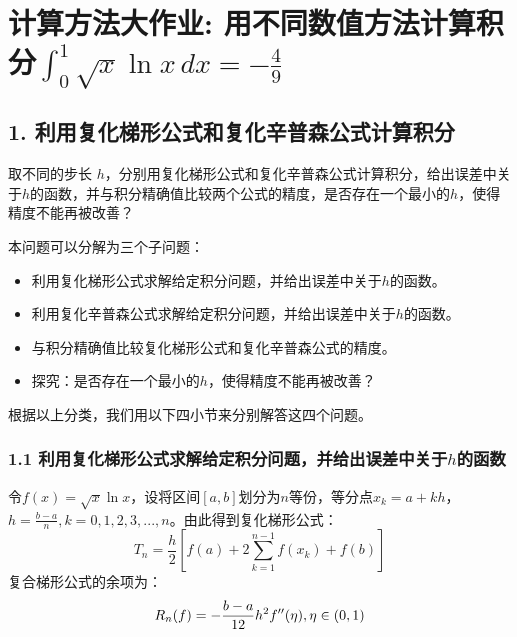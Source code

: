 
\chapter*{计算方法大作业: 用不同数值方法计算积分$\int_{0}^{1} \sqrt{x} \ln x  \,dx = -\frac{4}{9}$}

\section*{1. 利用复化梯形公式和复化辛普森公式计算积分}

取不同的步长 $h$，分别用复化梯形公式和复化辛普森公式计算积分，给出误差中关于$h$的函数，并与积分精确值比较两个公式的精度，是否存在一个最小的$h$，使得精度不能再被改善？

本问题可以分解为三个子问题：
\begin{itemize}
    \item 利用复化梯形公式求解给定积分问题，并给出误差中关于$h$的函数。
    \item 利用复化辛普森公式求解给定积分问题，并给出误差中关于$h$的函数。
    \item 与积分精确值比较复化梯形公式和复化辛普森公式的精度。
    \item 探究：是否存在一个最小的$h$，使得精度不能再被改善？
\end{itemize}

根据以上分类，我们用以下四小节来分别解答这四个问题。

\subsection*{1.1 利用复化梯形公式求解给定积分问题，并给出误差中关于$h$的函数}

令$f(x) = \sqrt{x} \ln x$，设将区间$[a,b]$划分为$n$等份，等分点$x_k = a + kh$，$h = \frac{b-a}{n},k=0,1,2,3,...,n$。由此得到复化梯形公式：
\begin{equation}
    T_n = \frac{h}{2} [f(a) + 2\sum_{k=1}^{n-1} f(x_k) + f(b) ]
    \label{eq:compound_trapezoid_general}
\end{equation}
复合梯形公式的余项为：
\begin{equation}
    R_n(f) = -\frac{b-a}{12} h^2 f^{\prime\prime} (\eta), \\ \eta\in(0,1)
    \label{eq:compound_trapezoid_R_general}
\end{equation}

